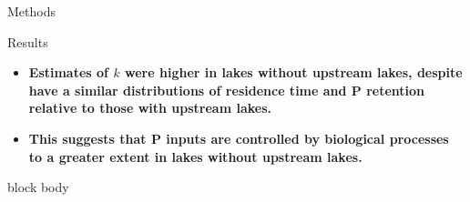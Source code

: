 \documentclass[final,hyperref={pdfpagelabels=false}]{beamer}
\begin{document}
\begin{frame}[t]
\begin{columns}[t]
\begin{column}{.465\textwidth}
\begin{block}{Methods}

\end{block}

% 
% 
% 


\begin{block}{Results}
\begin{itemize}
\item \textbf{Estimates of $k$ were higher in lakes without upstream lakes, despite have a similar distributions of residence time and P retention relative to those with upstream lakes.}
\vspace{1em}
\item \textbf{This suggests that P inputs are controlled by biological processes to a greater extent in lakes without upstream lakes.}
\end{itemize}
\end{block}

{
\begin{beamercolorbox}[wd=\textwidth,rounded=true]{block body}


\end{beamercolorbox}}
\end{column}
\end{columns}
\end{frame}
\end{document}
